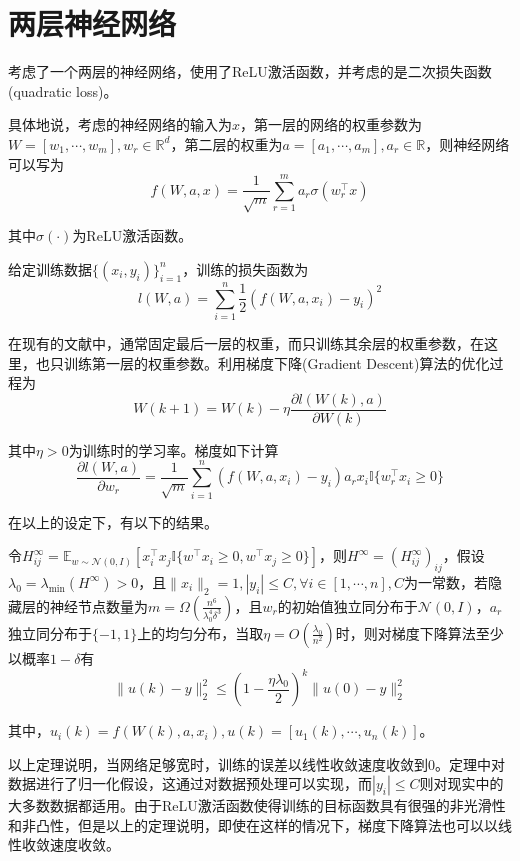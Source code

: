\section{两层神经网络}
\citet{du2018gradient}考虑了一个两层的神经网络，使用了ReLU激活函数，并考虑的是二次损失函数(quadratic loss)。
\par
具体地说，考虑的神经网络的输入为$x$，第一层的网络的权重参数为$W = [w_1,\cdots, w_m], w_r \in \mathbb{R}^d$，第二层的权重为$a = [a_1,\cdots, a_m], a_r \in \mathbb{R}$，则神经网络可以写为
\begin{equation}
f(W,a,x) = \frac{1}{\sqrt{m}}\sum_{r = 1}^m a_r \sigma(w_r^\top x)
\end{equation}
\par
其中$\sigma(\cdot)$为ReLU激活函数。
\par
给定训练数据$\{(x_i,y_i)\}_{i=1}^n$，训练的损失函数为
\begin{equation}
l(W,a) = \sum_{i=1}^n \frac{1}{2}(f(W,a,x_i)-y_i)^2
\end{equation}
\par
在现有的文献中，通常固定最后一层的权重，而只训练其余层的权重参数，在这里，也只训练第一层的权重参数。利用梯度下降(Gradient Descent)算法的优化过程为
\begin{equation}
W(k+1) = W(k) - \eta \frac{\partial l(W(k),a)}{\partial W(k)}
\end{equation}
\par
其中$\eta>0$为训练时的学习率。梯度如下计算
\begin{equation}
\frac{\partial l(W,a)}{\partial w_r} = \frac{1}{\sqrt{m}}\sum_{i=1}^n (f(W,a,x_i)-y_i)a_r x_i \mathbb{I}\{w_r^\top x_i \geq 0\}
\end{equation}
\par
在以上的设定下，有以下的结果。
\begin{theorem}\label{theo:2:1}
令$H^\infty_{ij} = \mathbb{E}_{w\sim \mathcal{N}(0,I)}[x_i^\top x_j \mathbb{I}\{w^\top x_i \geq 0, w^\top x_j \geq 0\}]$，则$H^\infty = (H^\infty_{ij})_{ij}$，假设$\lambda_0 = \lambda_{\min}(H^\infty) > 0$，且$\|x_i\|_2 = 1,|y_i| \leq C, \forall i\in [1,\cdots,n],C$为一常数，若隐藏层的神经节点数量为$m = \Omega(\frac{n^6}{\lambda_0^4\delta^3})$，且$w_r$的初始值独立同分布于$\mathcal{N}(0,I)$，$a_r$独立同分布于$\{-1,1\}$上的均匀分布，当取$\eta = O(\frac{\lambda_0}{n^2})$时，则对梯度下降算法至少以概率$1-\delta$有
\[
\|u(k)-y\|_2^2 \leq (1-\frac{\eta\lambda_0}{2})^k\|u(0)-y\|_2^2
\]
\par
其中，$u_i(k) = f(W(k),a,x_i), u(k) = [u_1(k),\cdots,u_n(k)]$。
\end{theorem}
\par
以上定理说明，当网络足够宽时，训练的误差以线性收敛速度收敛到0。定理中对数据进行了归一化假设，这通过对数据预处理可以实现，而$|y_i|\leq C$则对现实中的大多数数据都适用。由于ReLU激活函数使得训练的目标函数具有很强的非光滑性和非凸性，但是以上的定理说明，即使在这样的情况下，梯度下降算法也可以以线性收敛速度收敛。

